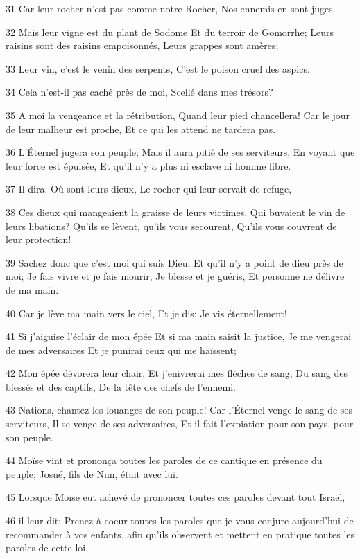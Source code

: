 \par 31 Car leur rocher n'est pas comme notre Rocher, Nos ennemis en sont juges.
\par 32 Mais leur vigne est du plant de Sodome Et du terroir de Gomorrhe; Leurs raisins sont des raisins empoisonnés, Leurs grappes sont amères;
\par 33 Leur vin, c'est le venin des serpents, C'est le poison cruel des aspics.
\par 34 Cela n'est-il pas caché près de moi, Scellé dans mes trésors?
\par 35 A moi la vengeance et la rétribution, Quand leur pied chancellera! Car le jour de leur malheur est proche, Et ce qui les attend ne tardera pas.
\par 36 L'Éternel jugera son peuple; Mais il aura pitié de ses serviteurs, En voyant que leur force est épuisée, Et qu'il n'y a plus ni esclave ni homme libre.
\par 37 Il dira: Où sont leurs dieux, Le rocher qui leur servait de refuge,
\par 38 Ces dieux qui mangeaient la graisse de leurs victimes, Qui buvaient le vin de leurs libations? Qu'ils se lèvent, qu'ils vous secourent, Qu'ils vous couvrent de leur protection!
\par 39 Sachez donc que c'est moi qui suis Dieu, Et qu'il n'y a point de dieu près de moi; Je fais vivre et je fais mourir, Je blesse et je guéris, Et personne ne délivre de ma main.
\par 40 Car je lève ma main vers le ciel, Et je dis: Je vis éternellement!
\par 41 Si j'aiguise l'éclair de mon épée Et si ma main saisit la justice, Je me vengerai de mes adversaires Et je punirai ceux qui me haïssent;
\par 42 Mon épée dévorera leur chair, Et j'enivrerai mes flèches de sang, Du sang des blessés et des captifs, De la tête des chefs de l'ennemi.
\par 43 Nations, chantez les louanges de son peuple! Car l'Éternel venge le sang de ses serviteurs, Il se venge de ses adversaires, Et il fait l'expiation pour son pays, pour son peuple.
\par 44 Moïse vint et prononça toutes les paroles de ce cantique en présence du peuple; Josué, fils de Nun, était avec lui.
\par 45 Lorsque Moïse eut achevé de prononcer toutes ces paroles devant tout Israël,
\par 46 il leur dit: Prenez à coeur toutes les paroles que je vous conjure aujourd'hui de recommander à vos enfants, afin qu'ils observent et mettent en pratique toutes les paroles de cette loi.
